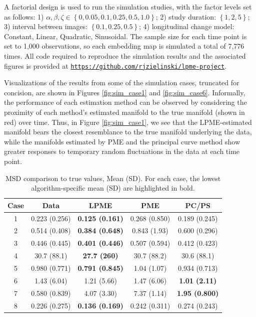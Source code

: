 \documentclass[11pt,reqno]{article}
\theoremstyle{definition}
\begin{document}
A factorial design is used to run the simulation studies, with the factor levels set as follows: 1) $\alpha, \beta, \zeta \in \left\{0, 0.05, 0.1, 0.25, 0.5, 1.0\right\}$; 2) study duration: $\left\{1, 2, 5\right\}$; 3) interval between images: $\left\{0.1, 0.25, 0.5\right\}$; 4) longitudinal change model: Constant, Linear, Quadratic, Sinusoidal. The sample size for each time point is set to 1,000 observations, so each embedding map is simulated a total of 7,776 times. All code required to reproduce the simulation results and the associated figures is provided at \href{https://github.com/rjzielinski/lpme-project}{\texttt{https://github.com/rjzielinski/lpme-project}}.

Visualizations of the results from some of the simulation cases, truncated for concision, are shown in Figures \ref{fig:sim_case1} and \ref{fig:sim_case6}. Informally, the performance of each estimation method can be observed by considering the proximity of each method's estimated manifold to the true manifold (shown in red) over time. Thus, in Figure \ref{fig:sim_case1}, we see that the LPME-estimated manifold bears the closest resemblance to the true manifold underlying the data, while the manifolds estimated by PME and the principal curve method show greater responses to temporary random fluctuations in the data at each time point.

\begin{table}[h]
  \centering
  \begin{tabular}{|c c c c c|}
    \hline
    Case & Data & LPME & PME & PC/PS \\
    \hline
    1 & 0.223 (0.256) & {\bf 0.125 (0.161)} & 0.268 (0.850) & 0.189 (0.245) \\
    2 & 0.514 (0.408) & {\bf 0.384 (0.648)} & 0.843 (1.93) & 0.600 (0.296) \\
    3 & 0.446 (0.445) & {\bf 0.401 (0.446)} & 0.507 (0.594) & 0.412 (0.423) \\
    4 & 30.7 (88.1) & {\bf 27.7 (260)} & 30.7 (88.2) & 30.6 (88.1) \\
    5 & 0.980 (0.771) & {\bf 0.791 (0.845)} & 1.04 (1.07) & 0.934 (0.713) \\
    6 & 1.43 (6.04) & 1.21 (5.66) & 1.47 (6.06) & {\bf 1.01 (2.11)} \\
    7 & 0.580 (0.839) & 4.07 (3.30) & 7.37 (1.14) & {\bf 1.95 (0.800)} \\
    8 & 0.226 (0.275) & {\bf 0.136 (0.169)} & 0.242 (0.311) & 0.274 (0.243) \\
    \hline
  \end{tabular}
  \caption{MSD comparison to true values, Mean (SD). For each case, the lowest algorithm-specific mean (SD) are highlighted in bold. }
  \label{table:simulation_results_mean}
\end{table}
\end{document}
